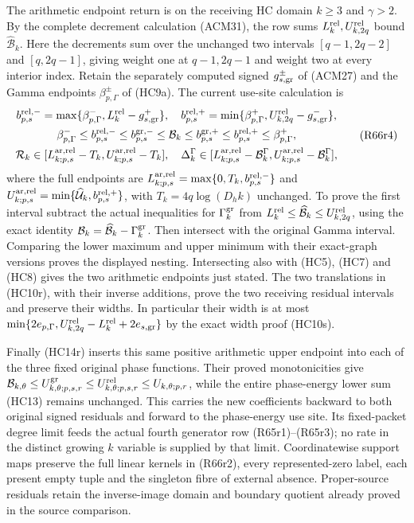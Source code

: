 The arithmetic endpoint return is on the receiving HC domain
$k\geq3$ and $\gamma>2$. By the complete decrement calculation
(ACM31), the row sums $L_k^{\rm rel},U_{k,2q}^{\rm rel}$
bound $\widehat{\mathcal B}_k$. Here the decrements sum over
the unchanged two intervals $[q-1,2q-2]$ and $[q,2q-1]$,
giving weight one at $q-1,2q-1$ and weight two at every
interior index. Retain the separately computed signed
$g_{s,\rm gr}^{\pm}$ of (ACM27) and the Gamma endpoints
$\beta_{p,\Gamma}^{\pm}$ of (HC9a). The current use-site
calculation is
\[
\begin{gathered}
 b_{p,s}^{\rm rel,-}
 =\max\{\beta_{p,\Gamma}^-,L_k^{\rm rel}-g_{s,\rm gr}^+\},
 \quad
 b_{p,s}^{\rm rel,+}
 =\min\{\beta_{p,\Gamma}^+,U_{k,2q}^{\rm rel}-g_{s,\rm gr}^-\},\\
 \beta_{p,\Gamma}^-\leq b_{p,s}^{\rm rel,-}
 \leq b_{p,s}^{\rm gr,-}\leq\mathcal B_k
 \leq b_{p,s}^{\rm gr,+}\leq b_{p,s}^{\rm rel,+}
 \leq\beta_{p,\Gamma}^+,\\
 \mathcal R_k\in
 [L_{k;p,s}^{\rm ar,rel}-T_k,U_{k;p,s}^{\rm ar,rel}-T_k],
 \quad
 \Delta_k^\Gamma\in
 [L_{k;p,s}^{\rm ar,rel}-\mathcal B_k^\Gamma,
  U_{k;p,s}^{\rm ar,rel}-\mathcal B_k^\Gamma],
\end{gathered}\tag{R66r4}
\]
where the full endpoints are
$L_{k;p,s}^{\rm ar,rel}=\max\{0,T_k,b_{p,s}^{\rm rel,-}\}$
and
$U_{k;p,s}^{\rm ar,rel}=\min\{\widehat{\mathcal U}_k,
b_{p,s}^{\rm rel,+}\}$, with $T_k=4q\log(D_hk)$ unchanged.
To prove the first interval subtract the actual inequalities
for $\Gamma_k^{\rm gr}$ from
$L_k^{\rm rel}\leq\widehat{\mathcal B}_k\leq U_{k,2q}^{\rm rel}$,
using the exact identity
$\mathcal B_k=\widehat{\mathcal B}_k-\Gamma_k^{\rm gr}$.
Then intersect with the original Gamma interval. Comparing the
lower maximum and upper minimum with their exact-graph versions
proves the displayed nesting. Intersecting also with (HC5),
(HC7) and (HC8) gives the two arithmetic endpoints just stated.
The two translations in (HC10r), with their inverse additions,
prove the two receiving residual intervals and preserve their
widths. In particular their width is at most
$\min\{2e_{p,\Gamma},U_{k,2q}^{\rm rel}-L_k^{\rm rel}
+2e_{s,\rm gr}\}$ by the exact width proof (HC10s).

Finally (HC14r) inserts this same positive arithmetic upper
endpoint into each of the three fixed original phase functions.
Their proved monotonicities give
$\mathcal B_{k,\theta}\leq U_{k,\theta;p,s,r}^{\rm gr}
\leq U_{k,\theta;p,s,r}^{\rm rel}\leq U_{k,\theta;p,r}$,
while the entire phase-energy lower sum (HC13) remains unchanged.
This carries the new coefficients backward to both original
signed residuals and forward to the phase-energy use site.
Its fixed-packet degree limit feeds the actual fourth generator
row (R65r1)--(R65r3); no rate in the distinct growing $k$ variable
is supplied by that limit. Coordinatewise support maps preserve
the full linear kernels in (R66r2), every represented-zero label,
each present empty tuple and the singleton fibre of external
absence. Proper-source residuals retain the inverse-image domain
and boundary quotient already proved in the source comparison.


